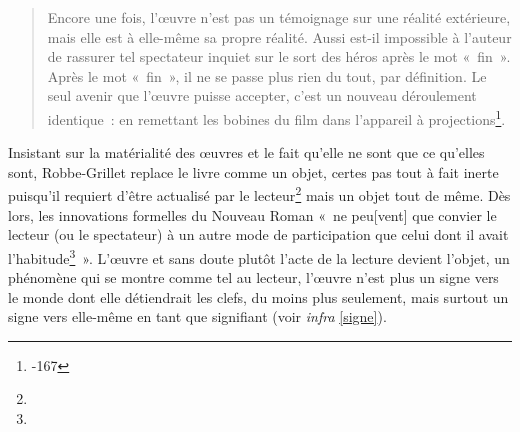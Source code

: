 \documentclass[12pt, a4paper]{article}
\begin{document}
\begin{quote}
    Encore une fois, l’œuvre n’est pas un témoignage sur une réalité extérieure, mais elle est à elle-même sa propre réalité. Aussi est-il impossible à l’auteur de rassurer tel spectateur inquiet sur le sort des héros après le mot «~fin~». Après le mot «~fin~», il ne se passe plus rien du tout, par définition. Le seul avenir que l’œuvre puisse accepter, c’est un nouveau déroulement identique~: en remettant les bobines du film dans l’appareil à projections\footnote{-167}.
\end{quote}
Insistant sur la matérialité des œuvres et le fait qu'elle ne sont que ce qu'elles sont, Robbe-Grillet replace le livre comme un objet, certes pas tout à fait inerte puisqu'il requiert d'être actualisé par le lecteur\footnote{} mais un objet tout de même. Dès lors, les innovations formelles du Nouveau Roman «~ne peu[vent] que convier le lecteur (ou le spectateur) à un autre mode de participation que celui dont il avait l’habitude\footnote{}~». L'œuvre et sans doute plutôt l'acte de la lecture devient l'objet, un phénomène qui se montre comme tel au lecteur, l'œuvre n'est plus un signe vers le monde dont elle détiendrait les clefs, du moins plus seulement, mais surtout un signe vers elle-même en tant que signifiant (voir \textit{infra} \ref{signe}). 
    


\end{document}
